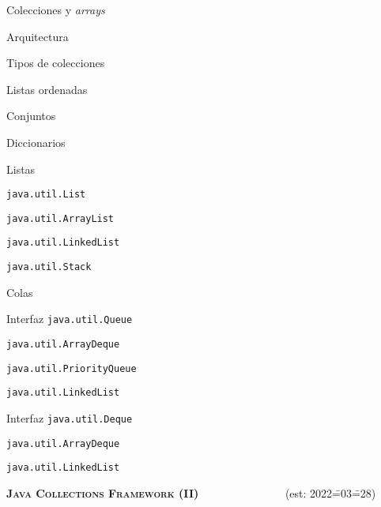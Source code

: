 \begin{longenum}
\begin{longenum}
        \item Colecciones y \textit{arrays}
        \item Arquitectura
        \item Tipos de colecciones
        \begin{longenum}
            \item Listas ordenadas
            \item Conjuntos
            \item Diccionarios
        \end{longenum}
        \item Listas
        \begin{longenum}
            \item \texttt{java.util.List}
            \begin{longenum}
                \item \texttt{java.util.ArrayList}
                \item \texttt{java.util.LinkedList}
                \item \texttt{java.util.Stack}
            \end{longenum}
        \end{longenum}
        \item Colas
        \begin{longenum}
            \item Interfaz \texttt{java.util.Queue}
            \begin{longenum}
                \item \texttt{java.util.ArrayDeque}
                \item \texttt{java.util.PriorityQueue}
                \item \texttt{java.util.LinkedList}
            \end{longenum}
            \item Interfaz \texttt{java.util.Deque}
            \begin{longenum}
                \item \texttt{java.util.ArrayDeque}
                \item \texttt{java.util.LinkedList}
            \end{longenum}
        \end{longenum}
    \end{longenum}
    \item \textbf{\textsc{Java Collections Framework (II)}} \ \ \ \ \ \ \ \ \ \ \ \ \ \ \ (est: 2022\==03\==28)

\end{longenum}
